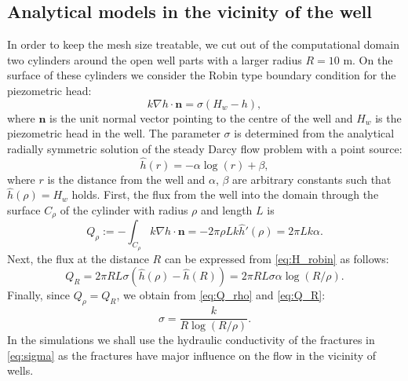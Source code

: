 \documentclass{article}
\newcommand{\eq}[1]{\begin{equation}#1\end{equation}}
\newcommand{\nn}{\vc n}
\newcommand{\vc}[1]{\boldsymbol{#1}}
\begin{document}







\subsection{Analytical models in the vicinity of the well}
\label{sec:analytic_wells}
In order to keep the mesh size treatable, we cut out of the computational domain two cylinders around the open well parts with a larger radius $R=10$ m. On the surface of these cylinders we consider the Robin type boundary condition for the piezometric head:
%
\eq{\label{eq:H_robin} k\nabla h\cdot\nn = \sigma(H_w-h), }
%
where $\nn$ is the unit normal vector pointing to the centre of the well and $H_w$ is the piezometric head in the well.
The parameter $\sigma$ is determined from the analytical radially symmetric solution
of the steady Darcy flow problem with a point source:
\[
    \hat h(r) = -\alpha \log (r) + \beta,
\]
where $r$ is the distance from the well and $\alpha$, $\beta$ are arbitrary constants such that $\hat h(\rho)=H_w$ holds.
First, the flux from the well into the domain through the surface $C_\rho$ of the cylinder with radius $\rho$ and length $L$ is
%  
\eq{\label{eq:Q_rho}    Q_\rho := -\int_{C_\rho} k\nabla h\cdot\nn = -2\pi \rho L k \hat h'(\rho) = 2\pi L k \alpha. }
%
Next, the flux at the distance $R$ can be expressed from \eqref{eq:H_robin} as follows:
%
\eq{\label{eq:Q_R}   Q_R = 2\pi R L \sigma (\hat h(\rho) - \hat h(R)) = 2\pi R L \sigma \alpha \log(R/\rho).}
%
Finally, since $Q_\rho=Q_R$, we obtain from \eqref{eq:Q_rho} and \eqref{eq:Q_R}:
\eq{ \label{eq:sigma} \sigma = \frac{k}{R\log(R/\rho)}. }
In the simulations we shall use the hydraulic conductivity of the fractures in \eqref{eq:sigma} as the fractures have major influence on the flow in the vicinity of wells.
\end{document}
